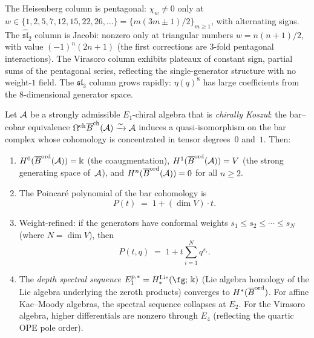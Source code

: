 \begin{computation}
The Heisenberg column is pentagonal: $\chi_w\ne 0$ only at
$w\in\{1,2,5,7,12,15,22,26,\ldots\}=\{m(3m{\pm}1)/2\}_{m\ge 1}$,
with alternating signs. The $\widehat{\mathfrak{sl}}_2$
column is Jacobi: nonzero only at triangular numbers
$w=n(n{+}1)/2$, with value $(-1)^n(2n{+}1)$ (the first
corrections are $3$-fold pentagonal interactions). The
Virasoro column exhibits plateaux of constant sign,
partial sums of the pentagonal series, reflecting the
single-generator structure with no weight-$1$ field.
The $\mathfrak{sl}_3$ column grows rapidly:
$\eta(q)^8$ has large coefficients from the $8$-dimensional
generator space.
\end{computation}

\begin{theorem}
\label{thm:bar-cohomology-concentration}
Let $\mathcal{A}$ be a strongly admissible $E_1$-chiral algebra that
is \emph{chirally Koszul}: the bar--cobar equivalence
$\Omega^{\mathrm{ch}}\overline{B}^{\mathrm{ch}}(\mathcal{A})\xrightarrow{\sim}\mathcal{A}$ induces a
quasi-isomorphism on the bar complex whose cohomology
is concentrated in tensor degrees~$0$ and~$1$. Then:
\begin{enumerate}[label=\textup{(\roman*)}]
\item $H^0(\overline{B}^{\mathrm{ord}}(\mathcal{A}))=\Bbbk$ (the
 coaugmentation), $H^1(\overline{B}^{\mathrm{ord}}(\mathcal{A}))=V$
 (the strong generating space of~$\mathcal{A}$), and
 $H^n(\overline{B}^{\mathrm{ord}}(\mathcal{A}))=0$ for all $n\ge 2$.
\item The Poincar\'e polynomial of the bar cohomology is
 \begin{equation}\label{eq:poincare-bar}
 P(t)\;=\;1+(\dim V)\cdot t.
 \end{equation}
\item Weight-refined: if the generators have conformal
 weights $s_1\le s_2\le\cdots\le s_N$ (where $N=\dim V$),
 then
 \begin{equation}\label{eq:poincare-bar-refined}
 P(t,q)\;=\;1+t\sum_{i=1}^N q^{s_i}.
 \end{equation}
\item The \emph{depth spectral sequence}
 $E_1^{p,*}=H_*^{\mathrm{Lie}}(\fg;\,\Bbbk)$
 (Lie algebra homology of the Lie algebra underlying the
 zeroth products) converges to $H^*(\overline{B}^{\mathrm{ord}})$.
 For affine Kac--Moody algebras, the spectral sequence
 collapses at $E_2$. For the Virasoro algebra, higher
 differentials are nonzero through $E_4$ (reflecting the
 quartic OPE pole order).
\end{enumerate}
\end{theorem}

